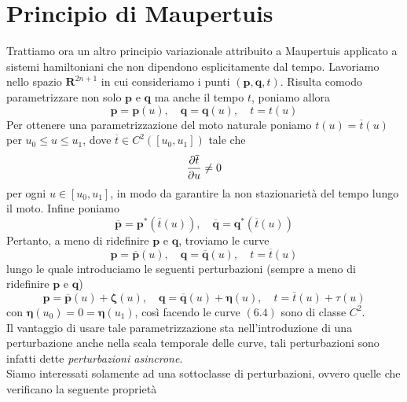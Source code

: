 \documentclass{article}
\begin{document}
\section{Principio di Maupertuis}
Trattiamo ora un altro principio variazionale attribuito a Maupertuis applicato a sistemi hamiltoniani che non dipendono esplicitamente dal tempo. Lavoriamo nello spazio $\mathbf{R}^{2n + 1}$ in cui consideriamo i punti $(\mathbf{p}, \mathbf{q}, t)$. Risulta comodo parametrizzare non solo $\mathbf{p}$ e $\mathbf{q}$ ma anche il tempo $t$, poniamo allora
\begin{equation}
    \mathbf{p} = \mathbf{p}(u), \quad \mathbf{q} = \mathbf{q}(u), \quad t = t(u) \tag{6.1}
\end{equation}
Per ottenere una parametrizzazione del moto naturale poniamo $t(u) = \overline{t}(u)$ per $u_0 \leq u \leq u_1$, dove $\overline{t} \in C^2\left([u_0, u_1]\right)$ tale che 
\begin{align}
    \frac{\partial \overline{t}}{\partial u} \neq 0 \notag
\end{align}
per ogni $u \in [u_0, u_1]$, in modo da garantire la non stazionarietà del tempo lungo il moto. Infine poniamo
\begin{equation}
    \mathbf{\overline{p}} = \mathbf{p}^*(\overline{t}(u)), \quad \mathbf{\overline{q}} = \mathbf{q}^*(\overline{t}(u)) \tag{6.2}
\end{equation}
Pertanto, a meno di ridefinire $\mathbf{p}$ e $\mathbf{q}$, troviamo le curve
\begin{equation}
    \mathbf{p} = \mathbf{\overline{p}}(u), \quad \mathbf{q} = \mathbf{\overline{q}}(u), \quad t = \overline{t}(u) \tag{6.3}
\end{equation}
lungo le quale introduciamo le seguenti perturbazioni (sempre a meno di ridefinire $\mathbf{p}$ e $\mathbf{q}$)
\begin{equation}
    \mathbf{p} = \mathbf{\overline{p}}(u) + \boldsymbol{\zeta}(u), \quad \mathbf{q} = \mathbf{\overline{q}}(u) + \boldsymbol{\eta}(u), \quad t = \overline{t}(u) + \tau (u) \tag{6.4}
\end{equation}
con $\boldsymbol{\eta}(u_0) = 0 = \boldsymbol{\eta}(u_1)$, così facendo le curve $(6.4)$ sono di classe $C^2$. \\
Il vantaggio di usare tale parametrizzazione sta nell'introduzione di una perturbazione anche nella scala temporale delle curve, tali perturbazioni sono infatti dette \textit{perturbazioni asincrone}. \\
Siamo interessati solamente ad una sottoclasse di perturbazioni, ovvero quelle che verificano la seguente proprietà
\end{document}
